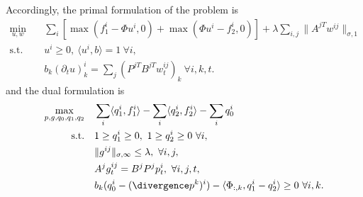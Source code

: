 Accordingly, the primal formulation of the problem is
\begin{align*}
    \min_{u, w} \quad
        & \sum_i \left[
            \max(f_1^i - \Phi u^i, 0) + \max(\Phi u^i - f_2^i, 0)
          \right] + \lambda \sum_{i,j} \| A^{jT} w^{ij} \|_{\sigma,1} \\
    \text{s.t.}\quad 
        & u^i \geq 0, ~\langle u^i, b \rangle = 1 ~\forall i, \\
        & b_k (\partial_t u)_k^i = \sum_j (P^{jT}B^{jT}w^{ij}_t)_{k} ~\forall i,k,t.
\end{align*}
and the dual formulation is
\begin{align*}
    \max_{p,g,q_0,q_1,q_2} \quad
        & \sum_{i} \langle q_1^i, f_1^i \rangle
        - \sum_{i} \langle q_2^i, f_2^i \rangle
        - \sum_i q_0^i \\
    \text{s.t.}\quad 
        & 1 \geq q_1^i \geq 0, ~1 \geq q_2^i \geq 0 ~\forall i, \\
        & \|g^{ij}\|_{\sigma,\infty} \leq \lambda, ~\forall i,j, \\
        & A^j g^{ij}_t = B^j P^j p^i_t, ~\forall i,j,t, \\
        & b_k (q_0^i - (\divergence p^k)^i) - \langle \Phi_{:,k}, q_1^i - q_2^i \rangle \geq 0 ~\forall i, k.
\end{align*}


